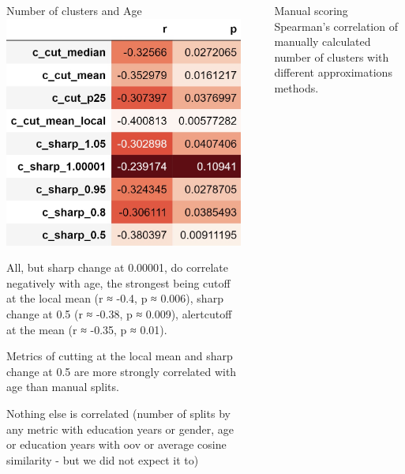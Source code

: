 \documentclass[xcolor=table]{beamer}
\newlength{\sepwidth}
\newcommand{\separatorcolumn}{\begin{column}{\sepwidth}\end{column}}
\begin{document}
\begin{frame}[t]
\begin{columns}[t]
\begin{column}{0.2\paperwidth}
\begin{block}{Number of clusters and Age}
            \includegraphics[scale=0.9]{pic/correlation_with_age.png}
        
             All, but sharp change at 0.00001, do correlate negatively with age, the strongest being \alert{cutoff at the local mean} (r  ≈  -0.4, p  ≈  0.006), \alert{sharp change at 0.5} (r  ≈  -0.38, p  ≈  0.009), alert{cutoff at the mean} (r  ≈  -0.35, p  ≈  0.01).
             
             Metrics of cutting at the local mean and sharp change at 0.5 are more strongly correlated with age than manual splits.
             
             Nothing else is correlated (number of splits by any metric with education years or gender, age or education years with oov or average cosine similarity - but we did not expect it to)
        \end{block}
    \end{column}
    \separatorcolumn
    \begin{column}{0.2\paperwidth}
        \begin{block}{Manual scoring}
            Spearman's correlation of manually calculated number of clusters with different approximations methods.
            

\end{block}
\end{column}
\end{columns}
\end{frame}
\end{document}
